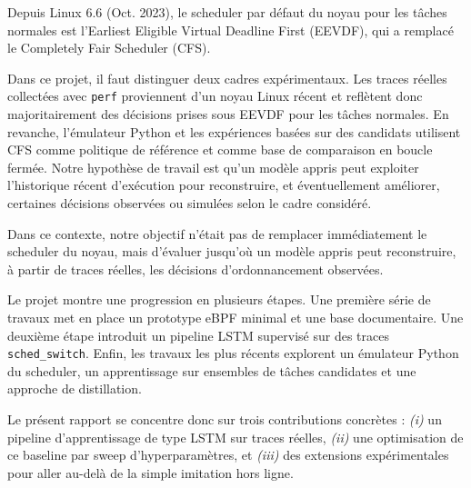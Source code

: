 \documentclass[letterpaper, 10 pt, conference]{ieeeconf}  %
\begin{document}
Depuis Linux 6.6 (Oct. 2023), le scheduler par défaut du noyau pour les tâches normales est l'Earliest Eligible Virtual Deadline First (EEVDF), qui a remplacé le Completely Fair Scheduler (CFS).

Dans ce projet, il faut distinguer deux cadres expérimentaux. Les traces réelles collectées avec \texttt{perf} proviennent d'un noyau Linux récent et reflètent donc majoritairement des décisions prises sous EEVDF pour les tâches normales. En revanche, l'émulateur Python et les expériences basées sur des candidats utilisent CFS comme politique de référence et comme base de comparaison en boucle fermée. Notre hypothèse de travail est qu'un modèle appris peut exploiter l'historique récent d'exécution pour reconstruire, et éventuellement améliorer, certaines décisions observées ou simulées selon le cadre considéré.

Dans ce contexte, notre objectif n'était pas de remplacer immédiatement le scheduler du noyau, mais d'évaluer jusqu'où un modèle appris peut reconstruire, à partir de traces réelles, les décisions d'ordonnancement observées.

Le projet montre une progression en plusieurs étapes. Une première série de travaux met en place un prototype eBPF minimal et une base documentaire. Une deuxième étape introduit un pipeline LSTM supervisé sur des traces \texttt{sched\_switch}. Enfin, les travaux les plus récents explorent un émulateur Python du scheduler, un apprentissage sur ensembles de tâches candidates et une approche de distillation.

Le présent rapport se concentre donc sur trois contributions concrètes : \textit{(i)} un pipeline d'apprentissage de type LSTM sur traces réelles, \textit{(ii)} une optimisation de ce baseline par sweep d'hyperparamètres, et \textit{(iii)} des extensions expérimentales pour aller au-delà de la simple imitation hors ligne.

\end{document}
